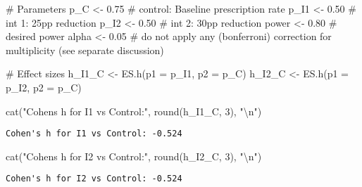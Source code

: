 \documentclass[
  letterpaper,
  DIV=11,
  numbers=noendperiod]{scrartcl}
\newenvironment{Shaded}{\begin{snugshade}}{\end{snugshade}}
\newcommand{\AttributeTok}[1]{\textcolor[rgb]{0.40,0.45,0.13}{#1}}
\newcommand{\CommentTok}[1]{\textcolor[rgb]{0.37,0.37,0.37}{#1}}
\newcommand{\DecValTok}[1]{\textcolor[rgb]{0.68,0.00,0.00}{#1}}
\newcommand{\FloatTok}[1]{\textcolor[rgb]{0.68,0.00,0.00}{#1}}
\newcommand{\FunctionTok}[1]{\textcolor[rgb]{0.28,0.35,0.67}{#1}}
\newcommand{\NormalTok}[1]{\textcolor[rgb]{0.00,0.23,0.31}{#1}}
\newcommand{\OtherTok}[1]{\textcolor[rgb]{0.00,0.23,0.31}{#1}}
\newcommand{\SpecialCharTok}[1]{\textcolor[rgb]{0.37,0.37,0.37}{#1}}
\newcommand{\StringTok}[1]{\textcolor[rgb]{0.13,0.47,0.30}{#1}}
\begin{document}
\begin{Shaded}
\begin{Highlighting}[]
\CommentTok{\# Parameters}
\NormalTok{p\_C }\OtherTok{\textless{}{-}} \FloatTok{0.75} \CommentTok{\# control: Baseline prescription rate}
\NormalTok{p\_I1 }\OtherTok{\textless{}{-}} \FloatTok{0.50} \CommentTok{\# int 1: 25pp reduction}
\NormalTok{p\_I2 }\OtherTok{\textless{}{-}} \FloatTok{0.50} \CommentTok{\# int 2: 30pp reduction}
\NormalTok{power }\OtherTok{\textless{}{-}} \FloatTok{0.80} \CommentTok{\# desired power}
\NormalTok{alpha }\OtherTok{\textless{}{-}} \FloatTok{0.05} \CommentTok{\# do not apply any (bonferroni) correction for multiplicity (see separate discussion)}

\CommentTok{\# Effect sizes}
\NormalTok{h\_I1\_C }\OtherTok{\textless{}{-}} \FunctionTok{ES.h}\NormalTok{(}\AttributeTok{p1 =}\NormalTok{ p\_I1, }\AttributeTok{p2 =}\NormalTok{ p\_C)}
\NormalTok{h\_I2\_C }\OtherTok{\textless{}{-}} \FunctionTok{ES.h}\NormalTok{(}\AttributeTok{p1 =}\NormalTok{ p\_I2, }\AttributeTok{p2 =}\NormalTok{ p\_C)}

\FunctionTok{cat}\NormalTok{(}\StringTok{"Cohen\textquotesingle{}s h for I1 vs Control:"}\NormalTok{, }\FunctionTok{round}\NormalTok{(h\_I1\_C, }\DecValTok{3}\NormalTok{), }\StringTok{"}\SpecialCharTok{\textbackslash{}n}\StringTok{"}\NormalTok{)}
\end{Highlighting}
\end{Shaded}

\begin{verbatim}
Cohen's h for I1 vs Control: -0.524 
\end{verbatim}

\begin{Shaded}
\begin{Highlighting}[]
\FunctionTok{cat}\NormalTok{(}\StringTok{"Cohen\textquotesingle{}s h for I2 vs Control:"}\NormalTok{, }\FunctionTok{round}\NormalTok{(h\_I2\_C, }\DecValTok{3}\NormalTok{), }\StringTok{"}\SpecialCharTok{\textbackslash{}n}\StringTok{"}\NormalTok{)}
\end{Highlighting}
\end{Shaded}

\begin{verbatim}
Cohen's h for I2 vs Control: -0.524 
\end{verbatim}
\end{document}
